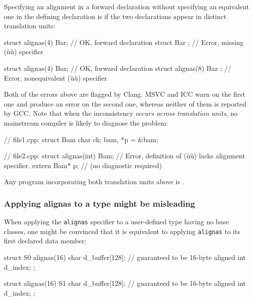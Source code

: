 \noindent Specifying an alignment in a forward declaration without specifying an
equivalent one in the defining declaration is  if the two declarations appear in distinct translation
units:

\begin{emcppslisting}
struct alignas(4) Bar;      // OK, forward declaration
struct Bar { };             // Error, missing (ù{}ù) specifier

struct alignas(4) Baz;      // OK, forward declaration
struct alignas(8) Baz { };  // Error, nonequivalent (ù{}ù) specifier
\end{emcppslisting}

\noindent Both of the errors above are flagged by Clang. MSVC and ICC warn on the first one and produce an error on the second one, whereas neither of them is
reported by GCC. Note that when the inconsistency \emph{occurs across
translation units}, no mainstream compiler is likely to diagnose the
problem:

\begin{emcppslisting}
// file1.cpp:
struct Bam { char ch; } bam, *p = &bam;

// file2.cpp:
struct alignas(int) Bam;  // Error, definition of (ù{}ù) lacks alignment specifier.
extern Bam* p;            //        (no diagnostic required)
\end{emcppslisting}

\noindent Any program incorporating both translation units above is
.

\subsubsection[Applying \lstinline!alignas! to a \emph{type} might be misleading]{Applying {\SubsubsecCode alignas} to a {\sfbsubsubsecitalRomeo type} might be misleading}\label{applying-alignas-to-a-type-might-be-misleading}

When applying the \lstinline!alignas! specifier to a user-defined type having no base classes, one might be convinced that it is equivalent to applying \lstinline!alignas! to its first declared data member:

\begin{emcppslisting}
struct S0 {
    alignas(16) char d_buffer[128];  // guaranteed to be 16-byte aligned
                int  d_index;
};

struct alignas(16) S1 {
    char d_buffer[128];              // guaranteed to be 16-byte aligned
    int  d_index;
};
\end{emcppslisting}

